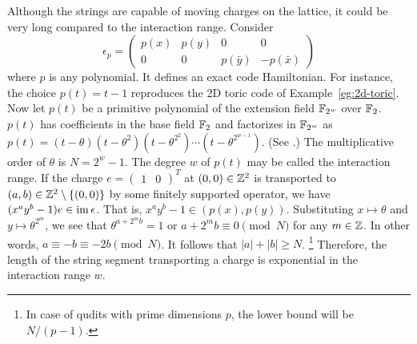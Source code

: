 \begin{rem}
\label{rem:long-string}
Although the strings are capable of moving charges on the lattice,
it could be very long compared to the interaction range.
Consider
\[
 \epsilon_p = 
\begin{pmatrix}
 p(x) & p(y) & 0         & 0          \\
 0    & 0    & p(\bar y) & -p(\bar x)
\end{pmatrix}
\]
where $p$ is any polynomial. It defines an exact code Hamiltonian.
For instance, the choice $p(t) = t-1$ reproduces the 2D toric code of Example~\ref{eg:2d-toric}.
Now let $p(t)$ be a primitive polynomial of the extension field $\mathbb{F}_{2^w}$ over $\mathbb{F}_2$.
$p(t)$ has coefficients in the base field $\mathbb{F}_2$ and factorizes in $\mathbb{F}_{2^w}$
as $p(t) = (t-\theta)(t-\theta^2)(t-\theta^{2^2})\cdots(t-\theta^{2^{w-1}})$.
(See \cite[Chapter~V Section~5]{Lang}.)
The multiplicative order of $\theta$ is $N = 2^w -1$.
The degree $w$ of $p(t)$ may be called the interaction range.
If the charge $e = \begin{pmatrix}1 & 0 \end{pmatrix}^T$ at $(0,0)\in \mathbb{Z}^2$
is transported to $(a,b) \in \mathbb{Z}^2 \setminus \{ (0,0) \}$ by some finitely supported operator,
we have $(x^a y^b -1)e \in \mathop{\mathrm{im}}\nolimits \epsilon$.
That is, $x^a y^b -1 \in (p(x),p(y))$.
Substituting $x \mapsto \theta$ and $y \mapsto \theta^{2^m}$,
we see that $\theta^{a+2^m b} = 1$ or $a+2^m b \equiv 0 \pmod N$ for any $m \in \mathbb{Z}$.
In other words, $a \equiv -b \equiv -2b \pmod N$. It follows that $|a| + |b| \ge N$.%
\footnote{In case of qudits with prime dimensions $p$,
the lower bound will be $N/(p-1)$.}
Therefore, the length of the string segment transporting a charge is exponential in the interaction range $w$.
\end{rem}

